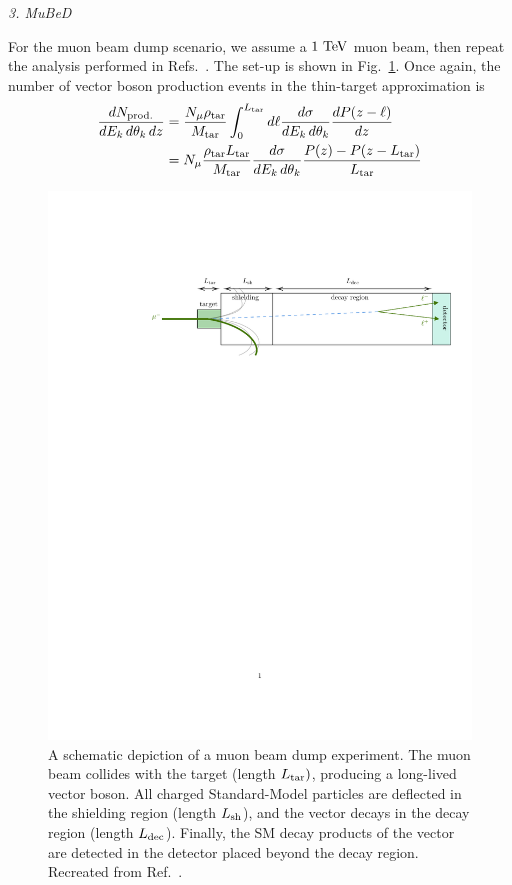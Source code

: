 \begin{center}
    {\it 3. MuBeD}
\end{center}

For the muon beam dump scenario, we assume a $1~{\rm TeV}$ muon beam, then repeat the analysis performed in  Refs.~\cite{Cesarotti:2022ttv,Cesarotti:2023sje}. The set-up is shown in Fig.~\ref{fig:MuBeD}. Once again, the number of vector boson production events in the thin-target approximation is
\begin{align}
    \frac{dN_{\rm prod.}}{dE_k\,d\theta_k\,dz} &= \frac{N_\mu \rho_{\rm tar}}{M_{\rm tar}}\int_0^{L_{\rm tar}}d\ell \frac{d\sigma}{dE_k\,d\theta_k}\frac{dP(z-\ell)}{dz}\nonumber\\
    &= N_\mu\frac{\rho_{\rm tar}L_{\rm tar}}{M_{\rm tar}}\frac{d\sigma}{dE_k\,d\theta_k}\frac{P(z) - P(z - L_{\rm tar})}{L_{\rm tar}}
\end{align}
\begin{figure}[t!]
    \centering
    \includegraphics[width=0.9\linewidth]{figures/chapter6/muon_beam_dump.pdf}
    \caption[A schematic depiction of a muon beam dump experiment.]{A schematic depiction of a muon beam dump experiment. The muon beam collides with the target (length $L_{\rm tar})$, producing a long-lived vector boson. All charged Standard-Model particles are deflected in the shielding region (length $L_{\rm sh}$), and the vector decays in the decay region (length $L_{\rm dec}$). Finally, the SM decay products of the vector are detected in the detector placed beyond the decay region. Recreated from Ref.~\cite{Cesarotti:2023sje}.}
    \label{fig:MuBeD}
\end{figure}
